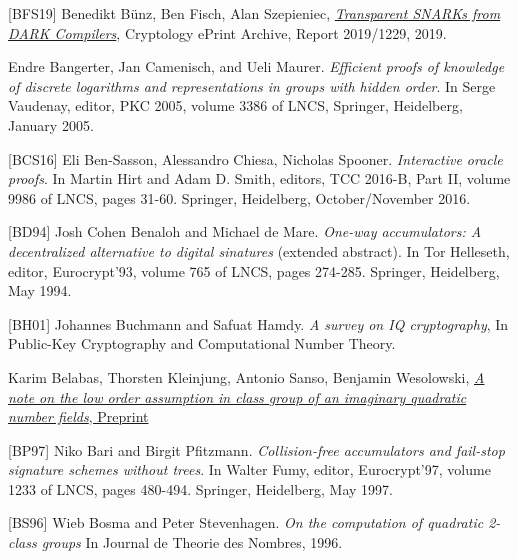 \documentclass[11pt, lettersize, notitlepage, leqno, footskip=0.6cm]{article}
\newcommand{\noin}{\noindent}
\numberwithin{equation}{section}
\begin{document}
\noin \hypertarget{BFS19}{[BFS19]} Benedikt B\"{u}nz, Ben Fisch, Alan Szepieniec, \href{https://eprint.iacr.org/2019/1229}{\textit{Transparent SNARKs from DARK Compilers}}, Cryptology ePrint Archive, Report 2019/1229, 2019.  \vspace{0.1cm}

\noin [BCM05] Endre Bangerter, Jan Camenisch, and Ueli Maurer. \textit{Efficient proofs of knowledge of discrete logarithms and representations in groups with hidden order}. In Serge Vaudenay, editor, PKC 2005, volume 3386 of LNCS, Springer, Heidelberg, January 2005.\vspace{0.1cm}

\noin \hypertarget{BCS16}{[BCS16]} Eli Ben-Sasson, Alessandro Chiesa, Nicholas Spooner. \textit{Interactive oracle proofs}. In Martin Hirt and Adam D. Smith, editors, TCC 2016-B, Part II, volume 9986 of LNCS, pages 31-60. Springer, Heidelberg,
October/November 2016.\vspace{0.1cm}

\noin \hypertarget{BD94}{[BD94]} Josh Cohen Benaloh and Michael de Mare. \textit{One-way accumulators: A decentralized alternative to digital sinatures} (extended abstract). In Tor Helleseth, editor, Eurocrypt'93, volume 765 of LNCS, pages 274-285. Springer, Heidelberg, May 1994.\vspace{0.1cm}

\noin \hypertarget{BH01}{[BH01]} Johannes Buchmann and Safuat Hamdy. \textit{A survey on IQ cryptography}, In Public-Key Cryptography and Computational Number Theory. \vspace{0.1cm}

\noin [BKSW20] Karim Belabas, Thorsten Kleinjung, Antonio Sanso, Benjamin Wesolowski, \href{https://eprint.iacr.org/2020/1310}{\textit{A note on the low order assumption in class group of an imaginary quadratic number fields}, Preprint} \vspace{0.1cm}

\noin \hypertarget{BP97}{[BP97]} Niko Bari and Birgit Pfitzmann. \textit{Collision-free accumulators and fail-stop signature schemes without trees}. In Walter Fumy, editor, Eurocrypt'97, volume 1233 of LNCS, pages 480-494. Springer, Heidelberg, May 1997. \vspace{0.1cm}

\noin \hypertarget{BS96}{[BS96]} Wieb Bosma and Peter Stevenhagen. \textit{On the computation of quadratic 2-class groups} In Journal de Theorie des Nombres, 1996. \vspace{0.1cm}
\end{document}
